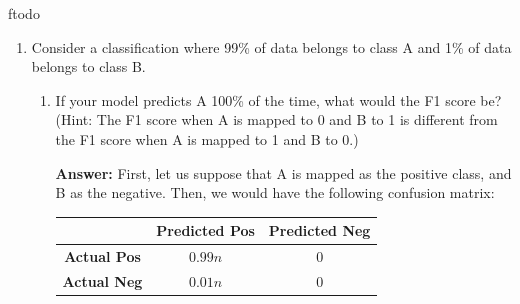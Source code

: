 ƒtodo\documentclass{article}
\newenvironment{QandA}{\begin{enumerate}[label=\arabic*.]}{\end{enumerate}}
\newenvironment{InnerQandA}{\begin{enumerate}[label=\roman*.]}{\end{enumerate}}
\newenvironment{answer}{\par\normalfont \textbf{Answer:}}{}
\begin{document}
\begin{QandA}
    \begin{InnerQandA}
        \item Calculate the model’s precision, recall, and F1.
        \begin{answer}
            \begin{align*}
                \text{Precision} &= \frac{\text{TP}}{\text{TP} + \text{FP}} = \frac{30}{30 + 5} = 0.85\\
                \text{Recall} &= \frac{\text{TP}}{\text{TP} + \text{FN}} = \frac{30}{30 + 20} = 0.6\\
                \text{F}_1 &= \frac{2 \cdot \text{Precision} \cdot \text{Recall}}{\text{Precision} + \text{Recall}} = \frac{2 \cdot 0.85 \cdot 0.6}{0.85 + 0.6} = 0.7034
            \end{align*}
        \end{answer}

        \item What can we do to improve the model’s performance?
        \begin{answer}
            The model is very conservative, in the sense that it rarely outputs the positive class (large number of False Negatives). The goal of improving the model's performance might be achieved by being more aggressive, and predicting the positive class more often. One way to do this is by lowering the threshold for which we predict a positive vs. negative class.
        \end{answer}
    \end{InnerQandA}

    \item Consider a classification where 99\% of data belongs to class A and 1\% of data belongs to class B.
    \begin{InnerQandA}
         \item If your model predicts A 100\% of the time, what would the F1 score be? (Hint: The F1 score when A is mapped to 0 and B to 1 is different from the F1 score when A is mapped to 1 and B to 0.)
         \begin{answer}
             First, let us suppose that A is mapped as the positive class, and B as the negative. Then, we would have the following confusion matrix:
            \begin{table}[htb!]
            \centering
            \begin{tabular}{|c|c|c|}
            \hline
                                  & \textbf{Predicted Pos} & \textbf{Predicted Neg} \\ \hline
            \textbf{Actual Pos}  & $0.99n$                      & 0                       \\ \hline
            \textbf{Actual Neg} & $0.01n$                       & 0                       \\ \hline
            \end{tabular}
            \end{table}


\end{answer}
\end{InnerQandA}
\end{QandA}
\end{document}
